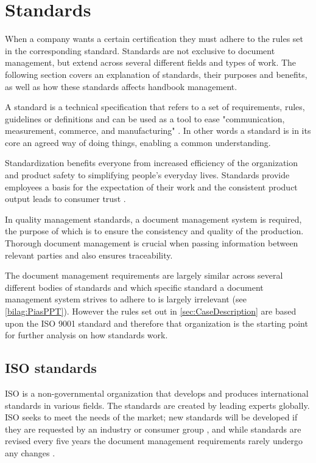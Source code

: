 \section{Standards} \label{sec:standards}
When a company wants a certain certification they must adhere to the rules set in the corresponding standard.
Standards are not exclusive to document management, but extend across several different fields and types of work.
The following section covers an explanation of standards, their purposes and benefits, as well as how these standards affects handbook management.

A standard is a technical specification that refers to a set of requirements, rules, guidelines or definitions \citep[p.~5]{Standard} and can be used as a tool to ease "communication, measurement, commerce, and manufacturing" \cite{Standardtool}.
In other words a standard is in its core an agreed way of doing things, enabling a common understanding.

Standardization benefits everyone from increased efficiency of the organization and product safety to simplifying people's everyday lives.
Standards provide employees a basis for the expectation of their work and the consistent product output leads to consumer trust \citep[p.~83]{Standardization}.

In quality management standards, a document management system is required, the purpose of which is to ensure the consistency and quality of the production.
Thorough document management is crucial when passing information between relevant parties and also ensures traceability.

The document management requirements are largely similar across several different bodies of standards and which specific standard a document management system strives to adhere to is largely irrelevant (see \cref{bilag:PiasPPT}).
However the rules set out in \cref{sec:CaseDescription} are based upon the ISO 9001 standard and therefore that organization is the starting point for further analysis on how standards work.

\subsection{ISO standards} \label{sec:ISOstandards}
ISO is a non-governmental organization that develops and produces international standards in various fields.
The standards are created by leading experts globally. \cite{ISOinfo}
ISO seeks to meet the needs of the market; new standards will be developed if they are requested by an industry or consumer group \cite{ISOdeveloping}, and while standards are revised every five years the document management requirements rarely undergo any changes \cite{ISOreviewedevery5years} \cite{Ipsenfirstinterview}.

